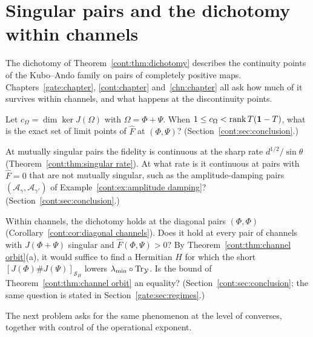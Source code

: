 \section{Singular pairs and the dichotomy within channels}\label{op:sec:singular}

The dichotomy of Theorem~\ref{cont:thm:dichotomy} describes the continuity points of the Kubo--Ando family on pairs of completely positive maps. Chapters~\ref{gate:chapter}, \ref{cont:chapter} and~\ref{chn:chapter} all ask how much of it survives within channels, and what happens at the discontinuity points.

\begin{problem}\label{op:prob:limit points}
Let $c_\Omega=\dim\ker J(\Omega)$ with $\Omega=\Phi+\Psi$. When $1\le c_\Omega<\operatorname{rank} T(\mathbf 1-T)$, what is the exact set of limit points of $\widehat F$ at $(\Phi,\Psi)$? (Section~\ref{cont:sec:conclusion}.)
\end{problem}

\begin{problem}\label{op:prob:rates}
At mutually singular pairs the fidelity is continuous at the sharp rate $d^{1/2}/\sin\theta$ (Theorem~\ref{cont:thm:singular rate}). At what rate is it continuous at pairs with $\widehat F=0$ that are not mutually singular, such as the amplitude-damping pairs $(\mathcal A_\gamma,\mathcal A_{\gamma'})$ of Example~\ref{cont:ex:amplitude damping}? (Section~\ref{cont:sec:conclusion}.)
\end{problem}

\begin{problem}\label{op:prob:channel dichotomy}
Within channels, the dichotomy holds at the diagonal pairs $(\Phi,\Phi)$ (Corollary~\ref{cont:cor:diagonal channels}). Does it hold at every pair of channels with $J(\Phi+\Psi)$ singular and $\widehat F(\Phi,\Psi)>0$? By Theorem~\ref{cont:thm:channel orbit}(a), it would suffice to find a Hermitian $H$ for which the short $[J(\Phi)\#J(\Psi)]_{\mathcal S_H}$ lowers $\lambda_{\min}\circ\operatorname{Tr}_{\mathcal Y}$. Is the bound of Theorem~\ref{cont:thm:channel orbit} an equality? (Section~\ref{cont:sec:conclusion}; the same question is stated in Section~\ref{gate:sec:regimes}.)
\end{problem}

The next problem asks for the same phenomenon at the level of converses, together with control of the operational exponent.

